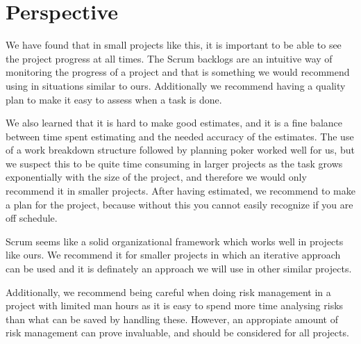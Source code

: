 \section{Perspective}
We have found that in small projects like this, it is important to be able to see the project progress at all times. The Scrum
backlogs are an intuitive way of monitoring the progress of a project and that is something we
would recommend using in situations similar to ours. Additionally we recommend having a quality plan to make it
easy to assess when a task is done.

We also learned that it is hard to make good estimates, and it is a fine
balance between time spent estimating and the needed accuracy of the estimates.
The use of a work breakdown structure followed by planning poker worked well for
us, but we suspect this to be quite time consuming in larger projects as the task grows exponentially with the
size of the project, and therefore we would only recommend it in smaller
projects. After having estimated, we recommend to make a plan for the project, because without
 this you cannot easily recognize if you are off schedule.

Scrum seems like a solid organizational framework which works well in projects like ours. We
recommend it for smaller projects in which an iterative approach can be
used and it is definately an approach we will use in other similar projects. 

Additionally, we recommend being careful when doing risk management in a project with limited man hours 
as it is easy to spend more time analysing risks than what can be saved by handling these. However, an appropiate amount of 
risk management can prove invaluable, and should be considered for all projects.

